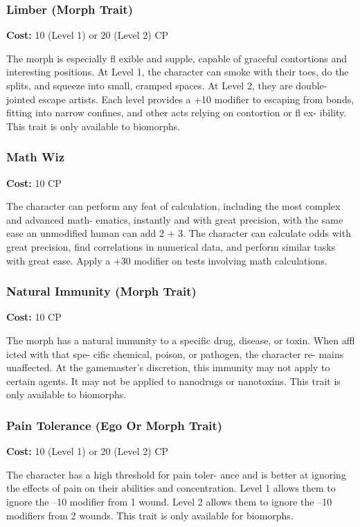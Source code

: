 \subsubsection{Limber (Morph Trait)}

\textbf{Cost:} 10 (Level 1) or 20 (Level 2) CP

The morph is especially fl exible and supple, capable of 
graceful contortions and interesting positions. At Level 
1, the character can smoke with their toes, do the splits, 
and squeeze into small, cramped spaces. At Level 2, they 
are double-jointed escape artists. Each level provides a 
+10 modifier to escaping from bonds, fitting into narrow 
confines, and other acts relying on contortion or fl ex-
ibility. This trait is only available to biomorphs.

\subsubsection{Math Wiz}

\textbf{Cost:} 10 CP

The character can perform any feat of calculation, 
including the most complex and advanced math-
ematics, instantly and with great precision, with the 
same ease an unmodified human can add 2 + 3. The 
character can calculate odds with great precision, find 
correlations in numerical data, and perform similar 
tasks with great ease. Apply a +30 modifier on tests 
involving math calculations.

\subsubsection{Natural Immunity (Morph Trait)}

\textbf{Cost:} 10 CP

The morph has a natural immunity to a specific 
drug, disease, or toxin. When affl icted with that spe-
cific chemical, poison, or pathogen, the character re-
mains unaffected. At the gamemaster's discretion, this 
immunity may not apply to certain agents. It may not 
be applied to nanodrugs or nanotoxins. This trait is 
only available to biomorphs.

\subsubsection{Pain Tolerance (Ego Or Morph Trait)}

\textbf{Cost:} 10 (Level 1) or 20 (Level 2) CP

The character has a high threshold for pain toler-
ance and is better at ignoring the effects of pain on 
their abilities and concentration. Level 1 allows them 
to ignore the –10 modifier from 1 wound. Level 2
allows them to ignore the –10 modifiers from 2 
wounds. This trait is only available for biomorphs.


